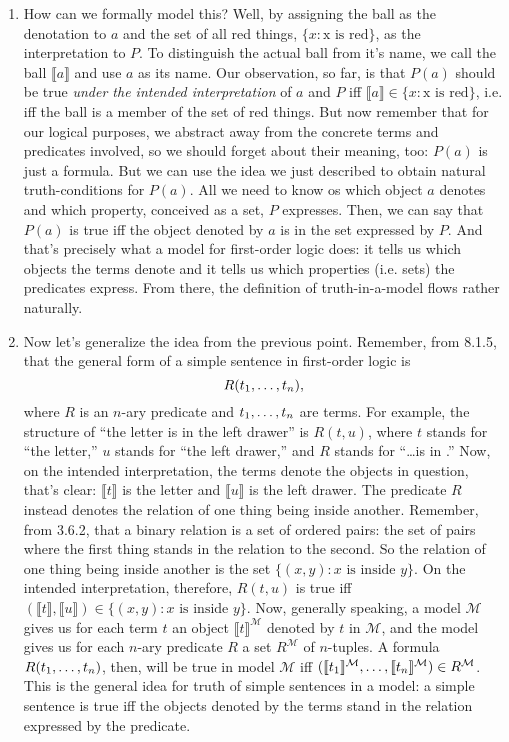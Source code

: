 \begin{enumerate}[\thesection.1]
		\item How can we formally model this? Well, by assigning the ball as the denotation to $a$ and the set of all red things, $\{x:\text{x is red}\}$, as the interpretation to $P$. To distinguish the actual ball from it's name, we call the ball $\llbracket a\rrbracket$ and use $a$ as its name. Our observation, so far, is that $P(a)$ should be true \emph{under the intended interpretation} of $a$ and $P$ iff $\llbracket a\rrbracket\in\{x:\text{x is red}\}$, i.e. iff the ball is a member of the set of red things. But now remember that for our logical purposes, we abstract away from the concrete terms and predicates involved, so we should forget about their meaning, too: $P(a)$ is just a formula. But we can use the idea we just described to obtain natural truth-conditions for $P(a)$. All we need to know os which object $a$ denotes and which property, conceived as a set, $P$ expresses. Then, we can say that $P(a)$ is true iff the object denoted by $a$ is in the set expressed by $P$. And that's precisely what a model for first-order logic does: it tells us which objects the terms denote and it tells us which properties (i.e. sets) the predicates express. From there, the definition of truth-in-a-model flows rather naturally.
		
		\item Now let's generalize the idea from the previous point. Remember, from 8.1.5, that the general form of a simple sentence in first-order logic is \[R(t_1, \mathellipsis, t_n),\] where $R$ is an $n$-ary predicate and $t_1,\mathellipsis, t_n$ are terms. For example, the structure of ``the letter is in the left drawer'' is $R(t,u)$, where $t$ stands for ``the letter,'' $u$ stands for ``the left drawer,'' and $R$ stands for ``\dots is in \underline{\phantom{\dots}}.'' Now, on the intended interpretation, the terms denote the objects in question, that's clear: $\llbracket t\rrbracket$ is the letter and $\llbracket u\rrbracket$ is the left drawer. The predicate $R$ instead denotes the relation of one thing being inside another. Remember, from 3.6.2, that a binary relation is a set of ordered pairs: the set of pairs where the first thing stands in the relation to the second. So the relation of one thing being inside another is the set $\{(x,y):x\text{ is inside }y\}$. On the intended interpretation, therefore, $R(t,u)$ is true iff $(\llbracket t\rrbracket, \llbracket u\rrbracket)\in \{(x,y):x\text{ is inside }y\}$. Now, generally speaking, a model $\mathcal{M}$ gives us for each term $t$ an object $\llbracket t\rrbracket^\mathcal{M}$ denoted by $t$ in $\mathcal{M}$, and the model gives us for each $n$-ary predicate $R$ a set $R^\mathcal{M}$ of $n$-tuples. A formula $R(t_1, \mathellipsis, t_n)$, then, will be true in model $\mathcal{M}$ iff $(\llbracket t_1\rrbracket^\mathcal{M}, \mathellipsis, \llbracket t_n\rrbracket^\mathcal{M})\in R^\mathcal{M}$. This is the general idea for truth of simple sentences in a model: a simple sentence is true iff the objects denoted by the terms stand in the relation expressed by the predicate. 		
		

\end{enumerate}
